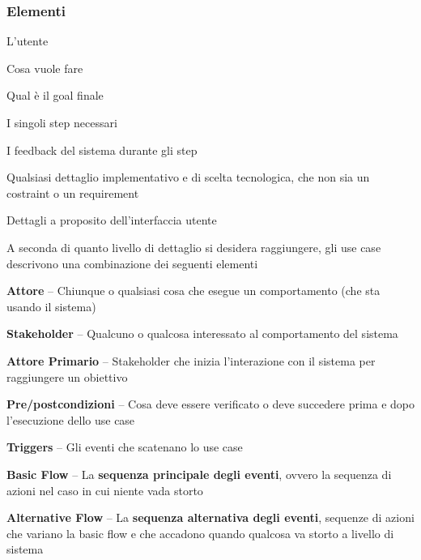 \documentclass[10pt]{article}
\begin{document}
\subsubsection{Elementi}
\begin{multicols}{2}
\begin{list}{}{\textbf{Cosa è incluso} in uno use case}
\item L'utente
\item Cosa vuole fare
\item Qual è il goal finale
\item I singoli step necessari
\item I feedback del sistema durante gli step
\end{list}
\columnbreak

\begin{list}{}{\textbf{Cosa non è incluso} in uno use case}
\item Qualsiasi dettaglio implementativo e di scelta tecnologica, che non sia un costraint o un requirement
\item Dettagli a proposito dell'interfaccia utente
\end{list}
\end{multicols}
A seconda di quanto livello di dettaglio si desidera raggiungere, gli use case descrivono una combinazione dei seguenti elementi
\begin{list}{}{}
\item \textbf{Attore} -- Chiunque o qualsiasi cosa che esegue un comportamento (che sta usando il sistema)
\item \textbf{Stakeholder} -- Qualcuno o qualcosa interessato al comportamento del sistema
\item \textbf{Attore Primario} -- Stakeholder che inizia l'interazione con il sistema per raggiungere un obiettivo
\item \textbf{Pre/postcondizioni} -- Cosa deve essere verificato o deve succedere prima e dopo l'esecuzione dello use case
\item \textbf{Triggers} -- Gli eventi che scatenano lo use case
\item \textbf{Basic Flow} -- La \textbf{sequenza principale degli eventi}, ovvero la sequenza di azioni nel caso in cui niente vada storto
\item \textbf{Alternative Flow} -- La \textbf{sequenza alternativa degli eventi}, sequenze di azioni che variano la basic flow e che accadono quando qualcosa va storto a livello di sistema
\end{list}
\end{document}
